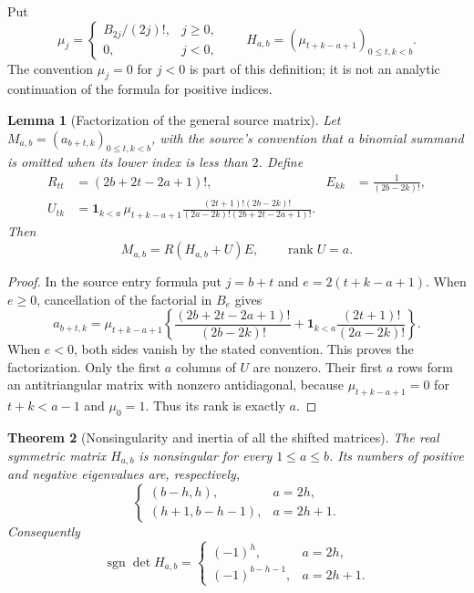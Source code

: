 \documentclass[11pt,a4paper]{article}
\numberwithin{equation}{section}
\theoremstyle{plain}
\newtheorem{theorem}{Theorem}[section]
\newtheorem{lemma}[theorem]{Lemma}
\theoremstyle{definition}
\theoremstyle{remark}
\begin{document}
Put
\[
 \mu_j=\begin{cases}B_{2j}/(2j)!,&j\geq0,\\0,&j<0,\end{cases}
 \qquad H_{a,b}=(\mu_{t+k-a+1})_{0\leq t,k<b}.
\]
The convention $\mu_j=0$ for $j<0$ is part of this definition; it is
not an analytic continuation of the formula for positive indices.

\begin{lemma}[Factorization of the general source matrix]
\label{lem:general-even-factor}
Let $M_{a,b}=(a_{b+t,k})_{0\leq t,k<b}$, with the source's convention
that a binomial summand is omitted when its lower index is less than
$2$.  Define
\begin{align*}
 R_{tt}&=(2b+2t-2a+1)!,& E_{kk}&=\frac1{(2b-2k)!},\\
 U_{tk}&=\mathbf1_{k<a}\,\mu_{t+k-a+1}
 \frac{(2t+1)!(2b-2k)!}
 {(2a-2k)!(2b+2t-2a+1)!}.
\end{align*}
Then
\[
 M_{a,b}=R(H_{a,b}+U)E,
 \qquad \operatorname{rank}U=a.
\]
\end{lemma}

\begin{proof}
In the source entry formula put $j=b+t$ and
$e=2(t+k-a+1)$.  When $e\geq0$, cancellation of the factorial in
$B_e$ gives
\[
 a_{b+t,k}=\mu_{t+k-a+1}\left\{
 \frac{(2b+2t-2a+1)!}{(2b-2k)!}
 +\mathbf1_{k<a}\frac{(2t+1)!}{(2a-2k)!}\right\}.
\]
When $e<0$, both sides vanish by the stated convention.  This proves
the factorization.  Only the first $a$ columns of $U$ are nonzero.
Their first $a$ rows form an antitriangular matrix with nonzero
antidiagonal, because $\mu_{t+k-a+1}=0$ for $t+k<a-1$ and
$\mu_0=1$.  Thus its rank is exactly $a$.
\end{proof}

\begin{theorem}[Nonsingularity and inertia of all the shifted matrices]
\label{thm:shifted-H-inertia}
The real symmetric matrix $H_{a,b}$ is nonsingular for every
$1\leq a\leq b$.  Its numbers of positive and negative eigenvalues
are, respectively,
\[
 \begin{cases}
 (b-h,h),&a=2h,\\
 (h+1,b-h-1),&a=2h+1.
 \end{cases}
\]
Consequently
\[
 \operatorname{sgn}\det H_{a,b}=
 \begin{cases}(-1)^h,&a=2h,\\
 (-1)^{b-h-1},&a=2h+1.
 \end{cases}
\]
\end{theorem}
\end{document}
